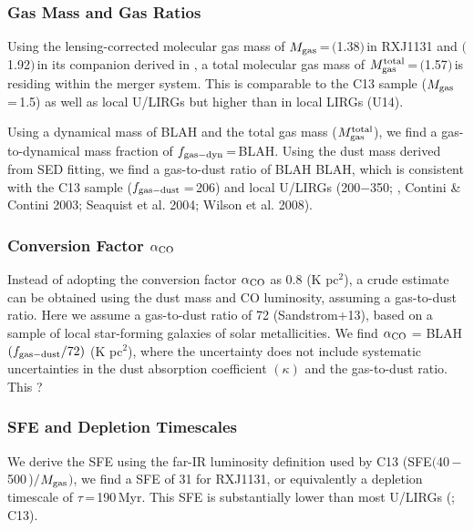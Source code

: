 \documentclass[]{emulateapj}
\begin{document}
\subsubsection{Gas Mass and Gas Ratios}
Using the lensing-corrected molecular gas mass of  
$M_{\rm gas}$\,=\,$($1.38$)$\,\Msun in RXJ1131 and
$($1.92$)$\,\Msun in its companion derived in , 
a total molecular gas mass of $M_{\rm gas}^{\rm total}$\,=\,$($1.57$)$\,\Msun is 
residing within the merger system. 
This is comparable to the
C13 sample ($M_{\rm gas}$\,=\,1.5\Msun) as well as
local U/LIRGs \citep{Solomon97a, Sanders96a} but higher than
in local LIRGs (U14).

Using a dynamical mass of BLAH and the total gas mass ($M_{\rm gas}^{\rm total}$),
we find a gas-to-dynamical mass fraction of $f_{\rm gas-dyn}$\,=\,BLAH.
Using the dust mass derived from SED fitting,
we find a gas-to-dust ratio of BLAH\pmm
BLAH, which is consistent with
the C13 sample ($f_{\rm gas-dust}$\,=\,206) and local U/LIRGs
(200$-$350; \citealt{Sanders91a}, Contini \& Contini 2003; Seaquist et al. 2004; Wilson et al. 2008).

\subsubsection{Conversion Factor $\alpha_{\rm CO}$}
Instead of adopting the conversion factor $\alpha_{\rm CO}$ as 0.8 (K \kms pc$^2$)\pmOne,
a crude estimate can be obtained using the dust mass and CO luminosity, assuming a 
gas-to-dust ratio.
Here we assume a gas-to-dust ratio of 72 (Sandstrom+13), based on a sample of local star-forming
galaxies of solar metallicities. 
We find $\alpha_{\rm CO}$ = BLAH\pmm$(f_{\rm gas-dust}/72)$ (K \kms pc$^2$)\pmOne, where the uncertainty does not include 
systematic uncertainties 
in the dust absorption coefficient $(\kappa)$ and the gas-to-dust ratio.
This ? 

\subsubsection{SFE and Depletion Timescales}
We derive the SFE using the far-IR luminosity definition used by
C13 (\ie SFE\pmm\LFIR$($40\,$-$\,500\,\micron)$/$$M_{\rm gas}$$)$,
we find a SFE of 31 for RXJ1131, or equivalently a depletion
timescale of $\tau$\,=\,190\,Myr. %
This SFE is substantially lower than most U/LIRGs
(\citealt{Solomon97a,Combes11a}; C13). %
\end{document}
